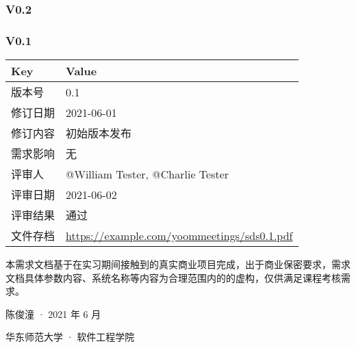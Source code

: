 \documentclass[]{ctexart}
\begin{document}
\hypertarget{v02}{%
\subsubsection{V0.2}\label{v02}}

\hypertarget{v01}{%
\subsubsection{V0.1}\label{v01}}

\begin{longtable}[]{@{}ll@{}}
\toprule
Key & Value\tabularnewline
\midrule
\endhead
版本号 & 0.1\tabularnewline
修订日期 & 2021-06-01\tabularnewline
修订内容 & 初始版本发布\tabularnewline
需求影响 & 无\tabularnewline
评审人 & @William Tester, @Charlie Tester\tabularnewline
评审日期 & 2021-06-02\tabularnewline
评审结果 & 通过\tabularnewline
文件存档 &
\url{https://example.com/yoommeetings/sds0.1.pdf}\tabularnewline
\bottomrule
\end{longtable}


本需求文档基于在实习期间接触到的真实商业项目完成，出于商业保密要求，需求文档具体参数内容、系统名称等内容为合理范围内的的虚构，仅供满足课程考核需求。

陈俊潼 · 2021 年 6 月

华东师范大学 · 软件工程学院
\end{document}
